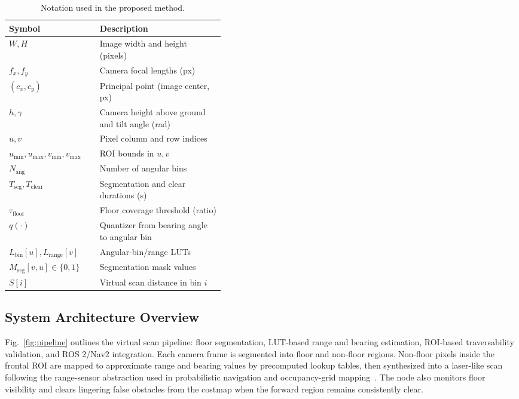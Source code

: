 \documentclass{IJCAS}
\begin{document}
\begin{table}[H]
  \centering
  \caption{Notation used in the proposed method.}
  \label{tab:notation}
  \begin{tabularx}{\linewidth}{@{}p{0.42\linewidth}X@{}}
    \toprule
    Symbol & Description \\
    \midrule
    \(W, H\) & Image width and height (pixels)\\
    \(f_x, f_y\) & Camera focal lengths (px)\\
    \((c_x, c_y)\) & Principal point (image center, px)\\
    \(h, \gamma\) & Camera height above ground and tilt angle (rad)\\
    \(u, v\) & Pixel column and row indices\\
    \(u_{\min},u_{\max},v_{\min},v_{\max}\) & ROI bounds in \(u,v\)\\
    \(N_{\mathrm{ang}}\) & Number of angular bins\\
    \(T_{\mathrm{seg}}, T_{\mathrm{clear}}\) & Segmentation and clear durations (s)\\
    \(\tau_{\mathrm{floor}}\) & Floor coverage threshold (ratio)\\
    \(q(\cdot)\) & Quantizer from bearing angle to angular bin\\
    \(L_{\mathrm{bin}}[u], L_{\mathrm{range}}[v]\) & Angular-bin/range LUTs\\
    \(M_{\mathrm{seg}}[v,u]\in\{0,1\}\) & Segmentation mask values\\
    \(S[i]\) & Virtual scan distance in bin \(i\)\\
    \bottomrule
  \end{tabularx}
\end{table}

\subsection{System Architecture Overview}

Fig.~\ref{fig:pipeline} outlines the virtual scan pipeline: floor segmentation, LUT-based range and bearing estimation, ROI-based traversability validation, and ROS 2/Nav2 integration. Each camera frame is segmented into floor and non-floor regions. Non-floor pixels inside the frontal ROI are mapped to approximate range and bearing values by precomputed lookup tables, then synthesized into a laser-like scan following the range-sensor abstraction used in probabilistic navigation and occupancy-grid mapping~\cite{thrun_2010_probabilistic,elfes_1989_using,moravec_1985_high}. The node also monitors floor visibility and clears lingering false obstacles from the costmap when the forward region remains consistently clear.
\end{document}
